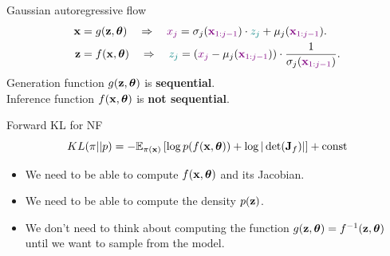 \begin{frame}{Gaussian autoregressive flow}
	\vspace{-0.2cm}
	\begin{align*}
		\mathbf{x} &= g(\mathbf{z}, \boldsymbol{\theta}) \quad \Rightarrow \quad {\color{violet} x_j} = \sigma_j ({\color{violet} \mathbf{x}_{1:j-1}}) \cdot {\color{teal} z_j} + \mu_j({\color{violet} \mathbf{x}_{1:j-1}}). \\
		\mathbf{z} &= f(\mathbf{x}, \boldsymbol{\theta}) \quad \Rightarrow \quad {\color{teal} z_j} = \left({\color{violet}x_j} - \mu_j({\color{violet}\mathbf{x}_{1:j-1}}) \right) \cdot \frac{1}{ \sigma_j ({\color{violet}\mathbf{x}_{1:j-1}})}.
	\end{align*}
	Generation function $g(\mathbf{z}, \boldsymbol{\theta})$ is \textbf{sequential}. \\ Inference function $f(\mathbf{x}, \boldsymbol{\theta})$ is \textbf{not sequential}.

	\begin{block}{Forward KL for NF}
		\vspace{-0.5cm}
		\[
			KL(\pi || p)  = - \mathbb{E}_{\pi(\mathbf{x})} \left[\log p(f(\mathbf{x}, \boldsymbol{\theta})) + \log  |\det (\mathbf{J}_f)|\right] + \text{const} 
		\]
		\vspace{-0.5cm}
		\begin{itemize}
			\item We need to be able to compute $f(\mathbf{x}, \boldsymbol{\theta})$ and its Jacobian.
			\item We need to be able to compute the density $p(\mathbf{z})$.
			\item We don’t need to think about computing the function $g(\mathbf{z}, \boldsymbol{\theta}) = f^{-1}(\mathbf{z}, \boldsymbol{\theta})$ until we want to sample from the model.
		\end{itemize}
	\end{block}
\end{frame}
